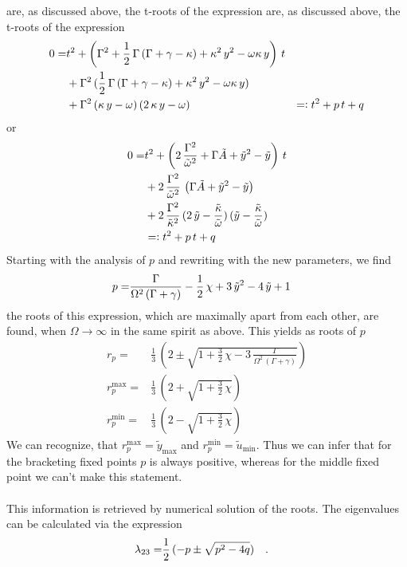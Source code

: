 \documentclass{article}
\begin{document}
are, as discussed above, the t-roots of the expression
are, as discussed above, the t-roots of the expression
\begin{align*}
    0=&t^2+\left( \Gamma^2 +\frac{1}{2}\,\Gamma\,(\Gamma+\gamma-\kappa)+\kappa^2\,y^2
    -\omega\kappa\,y\right)\,t\\
    &+\Gamma^2\,(\frac{1}{2}\,\Gamma\,(\Gamma+\gamma-\kappa)+\kappa^2\,y^2-\omega\kappa\,y)\\
    &+\Gamma^2\,(\kappa\,y-\omega)\,(2\,\kappa\,y-\omega)
    &=\vcentcolon t^2+p\,t+q
\end{align*}
or
\begin{align*}
    0=&t^2+\left( 2\,\frac{\Gamma^2}{\tilde{\omega}^2}+\Gamma\tilde{A}+\tilde{y}^2-\tilde{y} \right)\,t\\
    &+2\,\frac{\Gamma^2}{\tilde{\omega}^2}\,\left( \Gamma\tilde{A}+\tilde{y}^2-\tilde{y} \right)\\
    &+2\,\frac{\Gamma^2}{\tilde{\kappa}^2}\,(2\,\tilde{y}-\frac{\tilde{\kappa}}{\tilde{\omega}})\,(\tilde{y}-\frac{\tilde{\kappa}}{\tilde{\omega}})\\
    &=\vcentcolon t^2+p\,t+q
\end{align*}
Starting with the analysis of $p$ and rewriting with the new parameters, we find 
\begin{align*}
    p=&\frac{\Gamma}{\Omega^2\,(\Gamma+\gamma)}-\frac{1}{2}\,\chi+3\,\tilde{y}^2-4\,\tilde{y}+1
\end{align*}
the roots of this expression, which are maximally apart from each other, are found, when $\Omega\rightarrow\infty$ in the same spirit as above. This yields as roots of $p$
\begin{align*}
    r_p=&\frac{1}{3}\,\left( 2\pm\sqrt{1+\frac{3}{2}\,\chi-3\,\frac{\Gamma}{\Omega^2\,(\Gamma+\gamma)}} \right)\\
    r_p^\text{max}=&\frac{1}{3}\,\left( 2+\sqrt{1+\frac{3}{2}\,\chi} \right)\\
    r_p^\text{min}=&\frac{1}{3}\,\left( 2-\sqrt{1+\frac{3}{2}\,\chi} \right)
\end{align*}
We can recognize, that $r_p^\text{max}=\tilde{y}_\text{max}$ and $r_p^\text{min}=\tilde{u}_\text{min}$. Thus we can infer that for the bracketing fixed points $p$ is always positive, whereas for the middle fixed point we can't make this statement.\\\\
This information is retrieved by numerical solution of the roots. The eigenvalues can be calculated via the expression
\begin{align*}
    \lambda_{23}=&\frac{1}{2}\,(-p\pm\sqrt{p^2-4q})\quad.
\end{align*}
\end{document}
